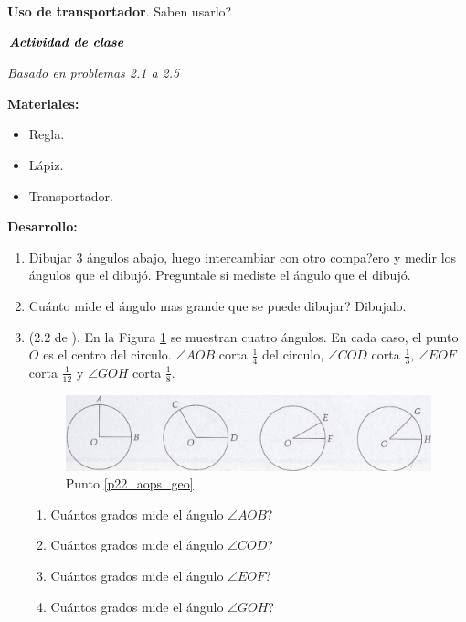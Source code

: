 \textbf{Uso de transportador}. Saben usarlo?


\clearpage


\begin{center}
	$\textbf{\textit{Actividad de clase}}$
\end{center}

\textit{Basado en \cite{Aops_Geometria} problemas 2.1 a 2.5}

\textbf{Materiales:} 
\begin{itemize}
	\item Regla.
	\item Lápiz.
	\item Transportador.
\end{itemize}

\textbf{Desarrollo:}
\begin{enumerate}
	\item Dibujar 3 ángulos abajo, luego intercambiar con otro compa?ero y medir los ángulos que el dibujó. Preguntale si mediste el ángulo que el dibujó.\vspace{6cm}
	\item Cuánto mide el ángulo mas grande que se puede dibujar? Dibujalo. \vspace{5cm}
	\item \label{p22_aops_geo} (2.2 de \cite{Aops_Geometria}). En la Figura \ref{P22_AOPS_GEO} se muestran cuatro ángulos. En cada caso, el punto $O$ es el centro del circulo. $\angle AOB$ corta $\frac{1}{4}$ del circulo,  $\angle COD$ corta $\frac{1}{3}$, $\angle EOF$ corta $\frac{1}{12}$ y $\angle GOH$ corta $\frac{1}{8}$.
	\begin{figure}[H]
		\centering
		\includegraphics[width=0.75\linewidth]{Geometria/imgs/P22_AOPS_GEO}
		\caption{Punto \ref{p22_aops_geo}}
		\label{P22_AOPS_GEO}
	\end{figure}
	
	\begin{enumerate}[label=\Alph*)]
		\item Cuántos grados mide el ángulo $\angle AOB$?
		\item Cuántos grados mide el ángulo $\angle COD$?
		\item Cuántos grados mide el ángulo $\angle EOF$?
		\item Cuántos grados mide el ángulo $\angle GOH$?		
	\end{enumerate}
	

\end{enumerate}
